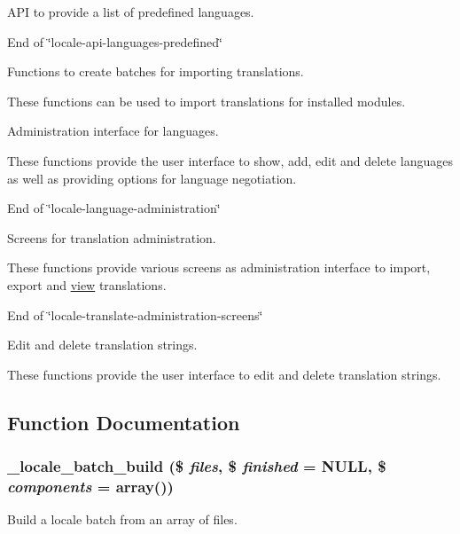 API to provide a list of predefined languages.

End of \char`\"{}locale-\/api-\/languages-\/predefined\char`\"{}

Functions to create batches for importing translations.

These functions can be used to import translations for installed modules.

Administration interface for languages.

These functions provide the user interface to show, add, edit and delete languages as well as providing options for language negotiation.

End of \char`\"{}locale-\/language-\/administration\char`\"{}

Screens for translation administration.

These functions provide various screens as administration interface to import, export and \hyperlink{classview}{view} translations.

End of \char`\"{}locale-\/translate-\/administration-\/screens\char`\"{}

Edit and delete translation strings.

These functions provide the user interface to edit and delete translation strings. 

\subsection{Function Documentation}
\hypertarget{group__locale_ga4f10893e8ed214fe4739b9415a06948a}{
\subsubsection[{\_\-locale\_\-batch\_\-build}]{\setlength{\rightskip}{0pt plus 5cm}\_\-locale\_\-batch\_\-build (\$ {\em files}, \/  \$ {\em finished} = {\ttfamily NULL}, \/  \$ {\em components} = {\ttfamily array()})}}
\label{group__locale_ga4f10893e8ed214fe4739b9415a06948a}
Build a locale batch from an array of files.


